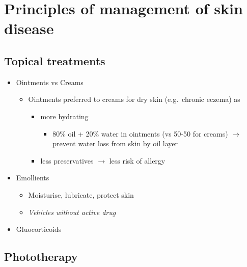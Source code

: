 \documentclass[
  12pt,
]{memoir}
\providecommand{\tightlist}{%
  \setlength{\itemsep}{0pt}\setlength{\parskip}{0pt}}
\begin{document}
\hypertarget{principles-of-management-of-skin-disease}{%
\section{Principles of management of skin
disease}\label{principles-of-management-of-skin-disease}}

\hypertarget{topical-treatments}{%
\subsection{Topical treatments}\label{topical-treatments}}

\begin{itemize}
\tightlist
\item
  Ointments vs Creams

  \begin{itemize}
  \tightlist
  \item
    Ointments preferred to creams for dry skin (e.g.~chronic eczema) as

    \begin{itemize}
    \tightlist
    \item
      more hydrating

      \begin{itemize}
      \tightlist
      \item
        80\% oil + 20\% water in ointments (vs 50-50 for creams)
        \(\rightarrow\) prevent water loss from skin by oil layer
      \end{itemize}
    \item
      less preservatives \(\rightarrow\) less risk of allergy
    \end{itemize}
  \end{itemize}
\item
  Emollients

  \begin{itemize}
  \tightlist
  \item
    Moisturise, lubricate, protect skin
  \item
    \emph{Vehicles without active drug}
  \end{itemize}
\item
  Gluocorticoids
\end{itemize}

\hypertarget{phototherapy}{%
\subsection{Phototherapy}\label{phototherapy}}
\end{document}
